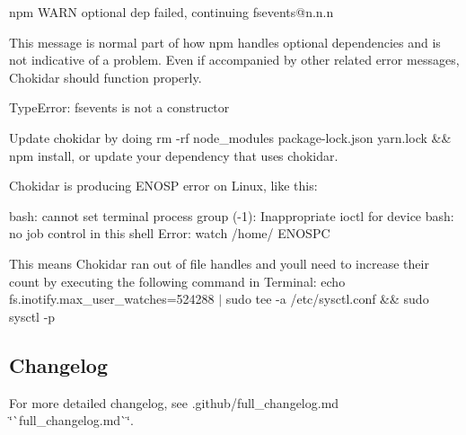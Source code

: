 \begin{DoxyItemize}
\item {\ttfamily npm W\+A\+RN optional dep failed, continuing fsevents@n.\+n.\+n}
\begin{DoxyItemize}
\item This message is normal part of how {\ttfamily npm} handles optional dependencies and is not indicative of a problem. Even if accompanied by other related error messages, Chokidar should function properly.
\end{DoxyItemize}
\item {\ttfamily Type\+Error\+: fsevents is not a constructor}
\begin{DoxyItemize}
\item Update chokidar by doing {\ttfamily rm -\/rf node\+\_\+modules package-\/lock.\+json yarn.\+lock \&\& npm install}, or update your dependency that uses chokidar.
\end{DoxyItemize}
\item Chokidar is producing {\ttfamily E\+N\+O\+SP} error on Linux, like this\+:
\begin{DoxyItemize}
\item {\ttfamily bash\+: cannot set terminal process group (-\/1)\+: Inappropriate ioctl for device bash\+: no job control in this shell} {\ttfamily Error\+: watch /home/ E\+N\+O\+S\+PC}
\item This means Chokidar ran out of file handles and you\textquotesingle{}ll need to increase their count by executing the following command in Terminal\+: {\ttfamily echo fs.\+inotify.\+max\+\_\+user\+\_\+watches=524288 $\vert$ sudo tee -\/a /etc/sysctl.conf \&\& sudo sysctl -\/p}
\end{DoxyItemize}
\end{DoxyItemize}

\subsection*{Changelog}

For more detailed changelog, see .github/full\+\_\+changelog.\+md \char`\"{}\`{}full\+\_\+changelog.\+md\`{}\char`\"{}.


